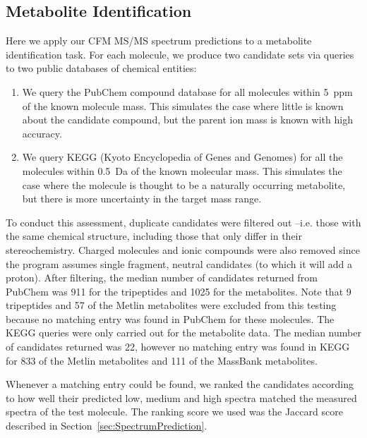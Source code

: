 \subsection{Metabolite Identification}
\label{sec:MetabId}

Here we apply our CFM MS/MS spectrum predictions to a metabolite identification task. 
For each molecule, we produce two candidate sets via queries to two public databases of chemical entities:
\begin{enumerate}
\item We query the PubChem compound database \citep{Bolton2008} for all molecules within 5~ppm of the known molecule mass. This simulates the case where little is known about the candidate compound, but the parent ion mass is known with high accuracy.
\item We query KEGG (Kyoto Encyclopedia of Genes and Genomes) \citep{Kanehisa2006} for all the molecules within 0.5~Da of the known molecular mass. This simulates the case where the molecule is thought to be a naturally occurring metabolite, but there is more uncertainty in the target mass range.
\end{enumerate} 

To conduct this assessment, duplicate candidates were filtered out --i.e. those with the same chemical structure, including those that only differ in their stereochemistry.
Charged molecules and ionic compounds were also removed since the program assumes single fragment, neutral candidates (to which it will add a proton).
After filtering, the median number of candidates returned from PubChem was 911 for the tripeptides and 1025 for the metabolites. 
Note that 9 tripeptides and 57 of the Metlin metabolites were excluded from this testing because no matching entry was found in PubChem for these molecules.
The KEGG queries were only carried out for the metabolite data. 
The median number of candidates returned was 22, however no matching entry was found in KEGG for 833 of the Metlin metabolites and 111 of the MassBank metabolites.

Whenever a matching entry could be found, we ranked the candidates according to how well their predicted low, medium and high spectra matched the measured spectra of the test molecule.
The ranking score we used was the Jaccard score described in Section~\ref{sec:SpectrumPrediction}.

